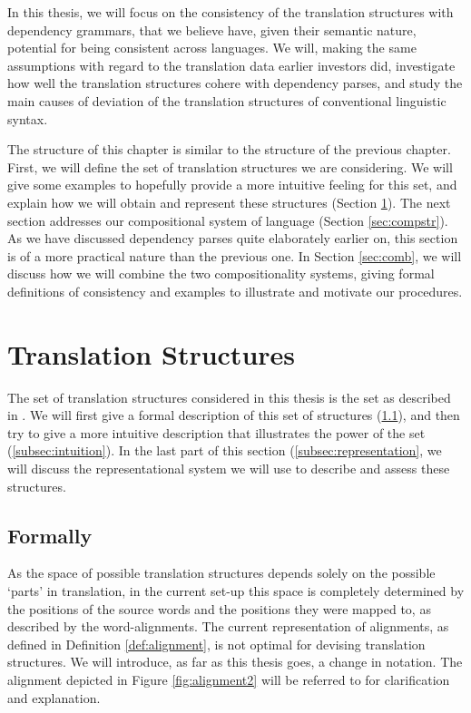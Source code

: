 \documentclass{report}
\theoremstyle{definition}
\theoremstyle{plain}
\begin{document}
In this thesis, we will focus on the consistency of the translation structures with dependency grammars, that we believe have, given their semantic nature, potential for being consistent across languages. We will, making the same assumptions with regard to the translation data earlier investors did, investigate how well the translation structures cohere with dependency parses, and study the main causes of deviation of the translation structures of conventional linguistic syntax.

The structure of this chapter is similar to the structure of the previous chapter. First, we will define the set of translation structures we are considering. We will give some examples to hopefully provide a more intuitive feeling for this set, and explain how we will obtain and represent these structures (Section \ref{sec:transstr}). The next section addresses our compositional system of language (Section \ref{sec:compstr}). As we have discussed dependency parses quite elaborately earlier on, this section is of a more practical nature than the previous one. In Section \ref{sec:comb}, we will discuss how we will combine the two compositionality systems, giving formal definitions of consistency and examples to illustrate and motivate our procedures.


\section{Translation Structures}
\label{sec:transstr}

The set of translation structures considered in this thesis is the set as described in \cite{simaan2013hats}. We will first give a formal description of this set of structures (\ref{subsec:hats}), and then try to give a more intuitive description that illustrates the power of the set (\ref{subsec:intuition}). In the last part of this section (\ref{subsec:representation}, we will discuss the representational system we will use to describe and assess these structures.

\subsection{Formally}
\label{subsec:hats}

As the space of possible translation structures depends solely on the possible `parts' in translation, in the current set-up this space is completely determined by the positions of the source words and the positions they were mapped to, as described by the word-alignments. The current representation of alignments, as defined in Definition \ref{def:alignment}, is not optimal for devising translation structures. We will introduce, as far as this thesis goes, a change in notation. The alignment depicted in Figure \ref{fig:alignment2} will be referred to for clarification and explanation.
\end{document}
